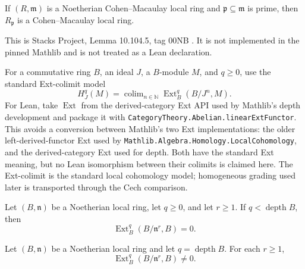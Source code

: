 \begin{theorem}\label{found:cm-localization}
If $(R,\mathfrak m)$ is a Noetherian Cohen--Macaulay local ring and
$\mathfrak p\subseteq\mathfrak m$ is prime, then $R_{\mathfrak p}$ is a
Cohen--Macaulay local ring.
\end{theorem}
This is Stacks Project, Lemma 10.104.5, tag 00NB
\cite{stacks-cm-localize}. It is not implemented in the pinned Mathlib
and is not treated as a Lean declaration.

\begin{definition}\label{def:local-cohomology}
For a commutative ring $B$, an ideal $J$, a $B$-module $M$, and $q\ge0$,
use the standard Ext-colimit model
\[
 H^q_J(M)=\mathop{\mathrm{colim}}_{n\in\mathbb N}
           \operatorname{Ext}^q_B(B/J^n,M).
\]
For Lean, take $\operatorname{Ext}$ from the derived-category Ext API used
by Mathlib's depth development and package it with
\texttt{CategoryTheory.Abelian.linearExtFunctor}. This avoids a conversion
between Mathlib's two Ext implementations: the older left-derived-functor
Ext used by \texttt{Mathlib.Algebra.Homology.LocalCohomology}, and the
derived-category Ext used for depth. Both have the standard Ext meaning, but
no Lean isomorphism between their colimits is claimed here. The Ext-colimit
is the standard local cohomology model; homogeneous grading used later is
transported through the Cech comparison.
\leanok
\end{definition}

\begin{lemma}\label{lem:depth-ext-stage-vanishing}
Let $(B,\mathfrak n)$ be a Noetherian local ring, let $q\ge0$, and let
$r\ge1$. If $q<\operatorname{depth}B$, then
\[
 \operatorname{Ext}^q_B(B/\mathfrak n^r,B)=0.
\]
\leanok
\end{lemma}

\begin{lemma}\label{lem:depth-ext-stage-nontrivial}
Let $(B,\mathfrak n)$ be a Noetherian local ring and let
$q=\operatorname{depth}B$. For each $r\ge1$,
\[
 \operatorname{Ext}^q_B(B/\mathfrak n^r,B)\ne0.
\]
\leanok
\end{lemma}

